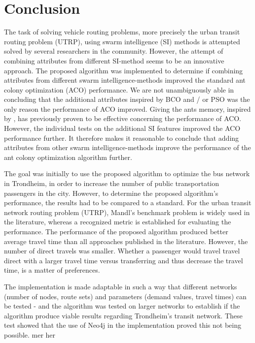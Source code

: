 \section{Conclusion}

The task of solving vehicle routing problems, more precisely the urban transit routing problem (UTRP), using swarm intelligence (SI) methods is attempted solved by several researchers in the community. However, the attempt of combining attributes from different SI-method seems to be an innovative approach. The proposed algorithm was implemented to determine if combining attributes from different swarm intelligence-methods improved the standard ant colony optimization (ACO) performance. We are not unambiguously able in concluding that the additional attributes inspired by BCO and / or PSO was the only reason the performance of ACO improved. Giving the ants memory, inspired by \citet{dorigo96}, has previously proven to be effective concerning the performance of ACO. However, the individual tests on the additional SI features improved the ACO performance further. It therefore makes it reasonable to conclude that adding attributes from other swarm intelligence-methods improve the performance of the ant colony optimization algorithm further.

The goal was initially to use the proposed algorithm to optimize the bus network in Trondheim, in order to increase the number of public transportation passengers in the city. However, to determine the proposed algorithm's performance, the results had to be compared to a standard. For the urban transit network routing problem (UTRP), Mandl's benchmark problem is widely used in the literature, whereas a recognized metric is established for evaluating the performance. The performance of the proposed algorithm produced better average travel time than all approaches published in the literature. However, the number of direct travels was smaller. Whether a passenger would travel travel direct with a larger travel time versus transferring and thus decrease the travel time, is a matter of preferences.

The implementation is made adaptable in such a way that different networks (number of nodes, route sets) and parameters (demand values, travel times) can be tested - and the algorithm was tested on larger networks to establish if the algorithm produce viable results regarding Trondheim's transit network. These test showed that the use of Neo4j in the implementation proved this not being possible. mer her

